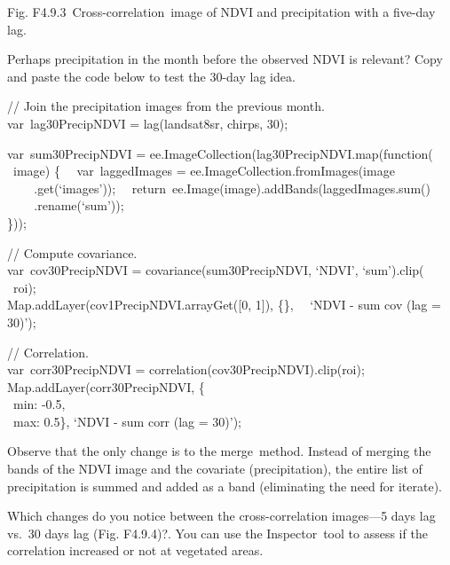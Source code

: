 \documentclass[
  letterpaper,
  DIV=11,
  numbers=noendperiod]{scrreprt}
\begin{document}
Fig. F4.9.3~Cross-correlation~image of NDVI and precipitation with a
five-day lag.

Perhaps precipitation in the month before the observed NDVI is relevant?
Copy and paste the code below to test the 30-day lag idea.

// Join the precipitation images from the previous month.\\
var~lag30PrecipNDVI = lag(landsat8sr, chirps, 30);

var~sum30PrecipNDVI = ee.ImageCollection(lag30PrecipNDVI.map(function(\\
\hspace*{0.333em} ~image) \{~ ~var~laggedImages =
ee.ImageCollection.fromImages(image\\
\hspace*{0.333em} ~ ~ ~.get(`images'));~
~return~ee.Image(image).addBands(laggedImages.sum()\\
\hspace*{0.333em} ~ ~ ~.rename(`sum'));\\
\}));

// Compute covariance.\\
var~cov30PrecipNDVI = covariance(sum30PrecipNDVI, `NDVI', `sum').clip(\\
\hspace*{0.333em} ~roi);\\
Map.addLayer(cov1PrecipNDVI.arrayGet({[}0, 1{]}), \{\},~ ~`NDVI - sum
cov (lag = 30)');

// Correlation.\\
var~corr30PrecipNDVI = correlation(cov30PrecipNDVI).clip(roi);\\
Map.addLayer(corr30PrecipNDVI, \{\\
\hspace*{0.333em} ~min: -0.5,\\
\hspace*{0.333em} ~max: 0.5\}, `NDVI - sum corr (lag = 30)');

Observe that the only change is to the merge~method. Instead of merging
the bands of the NDVI image and the covariate (precipitation), the
entire list of precipitation is summed and added as a band (eliminating
the need for iterate).

Which changes do you notice between the cross-correlation images---5
days lag vs.~30 days lag (Fig. F4.9.4)?. You can use the Inspector~tool
to assess if the correlation increased or not at vegetated areas.
\end{document}
